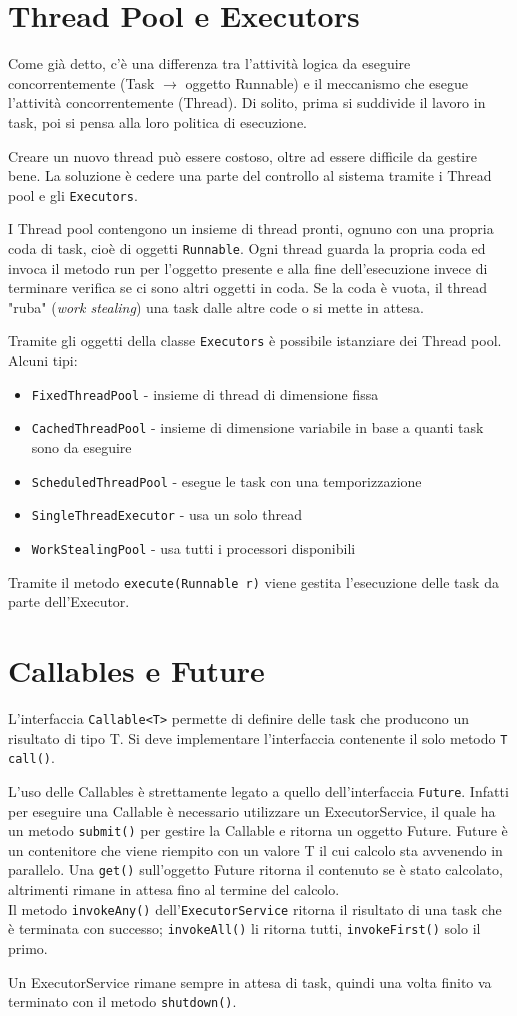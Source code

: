\section{Thread Pool e Executors}
Come già detto, c'è una differenza tra l'attività logica da eseguire concorrentemente (Task $\rightarrow$ oggetto Runnable) e il meccanismo che esegue l'attività concorrentemente (Thread). Di solito, prima si suddivide il lavoro in task, poi si pensa alla loro politica di esecuzione.

Creare un nuovo thread può essere costoso, oltre ad essere difficile da gestire bene. La soluzione è cedere una parte del controllo al sistema tramite i Thread pool e gli \texttt{Executors}.

I Thread pool contengono un insieme di thread pronti, ognuno con una propria coda di task, cioè di oggetti \texttt{Runnable}. Ogni thread guarda la propria coda ed invoca il metodo run per l'oggetto presente e alla fine dell'esecuzione invece di terminare verifica se ci sono altri oggetti in coda. Se la coda è vuota, il thread "ruba" (\textit{work stealing}) una task dalle altre code o si mette in attesa.

Tramite gli oggetti della classe \texttt{Executors} è possibile istanziare dei Thread pool. Alcuni tipi:
\begin{itemize}
\item \texttt{FixedThreadPool} - insieme di thread di dimensione fissa
\item \texttt{CachedThreadPool} - insieme di dimensione variabile in base a quanti task sono da eseguire
\item \texttt{ScheduledThreadPool} - esegue le task con una temporizzazione
\item \texttt{SingleThreadExecutor} - usa un solo thread
\item \texttt{WorkStealingPool} - usa tutti i processori disponibili
\end{itemize}
Tramite il metodo \texttt{execute(Runnable r)} viene gestita l'esecuzione delle task da parte dell'Executor.

\section{Callables e Future}
L'interfaccia \texttt{Callable<T>} permette di definire delle task che producono un risultato di tipo T. Si deve implementare l'interfaccia contenente il solo metodo \texttt{T call()}.

L'uso delle Callables è strettamente legato a quello dell'interfaccia \texttt{Future}. Infatti per eseguire una Callable è necessario utilizzare un ExecutorService, il quale ha un metodo \texttt{submit()} per gestire la Callable e ritorna un oggetto Future. Future è un contenitore che viene riempito con un valore T il cui calcolo sta avvenendo in parallelo. Una \texttt{get()} sull'oggetto Future ritorna il contenuto se è stato calcolato, altrimenti rimane in attesa fino al termine del calcolo. \\
Il metodo \texttt{invokeAny()} dell'\texttt{ExecutorService} ritorna il risultato di una task che è terminata con successo; \texttt{invokeAll()} li ritorna tutti, \texttt{invokeFirst()} solo il primo.

Un ExecutorService rimane sempre in attesa di task, quindi una volta finito va terminato con il metodo \texttt{shutdown()}.
